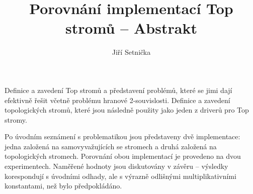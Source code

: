 \documentclass{article}
\author{Jiří Setnička}
\title{Porovnání implementací Top stromů -- Abstrakt}
\date{}
\begin{document}
\maketitle

Definice a zavedení Top stromů a představení problémů, které se jimi dají
efektivně řešit včetně problému hranové 2-souvislosti. Definice a zavedení
topologických stromů, které jsou následně použity jako jeden z driverů pro Top
stromy.

Po úvodním seznámení s problematikou jsou představeny dvě implementace: jedna
založená na samovyvažujících se stromech a druhá založená na topologických
stromech. Porovnání obou implementací je provedeno na dvou experimentech.
Naměřené hodnoty jsou diskutovány v závěru -- výsledky korespondují s úvodními
odhady, ale s výrazně odlišnými multiplikativními konstantami, než bylo
předpokládáno.
\end{document}

